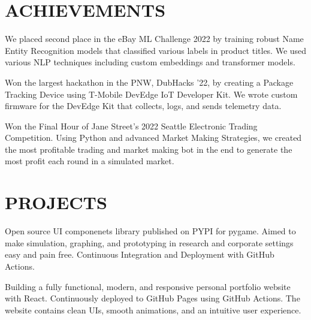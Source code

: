 \documentclass[]{main}
\begin{document}
\begin{minipage}[t]{0.66\textwidth}
\section{ACHIEVEMENTS}

We placed second place in the eBay ML Challenge 2022 by training robust Name Entity Recognition models that classified various labels in product titles. We used various NLP techniques including custom embeddings and transformer models.
\sectionsep

Won the largest hackathon in the PNW, DubHacks '22, by creating a Package Tracking Device using T-Mobile DevEdge IoT Developer Kit. We wrote custom firmware for the DevEdge Kit that collects, logs, and sends telemetry data.
\sectionsep

Won the Final Hour of Jane Street's 2022 Seattle Electronic Trading Competition. Using Python and advanced Market Making Strategies, we created the most profitable trading and market making bot in the end to generate the most profit each round in a simulated market.
\sectionsep



\section{PROJECTS}
Open source UI componenets library published on PYPI for pygame. Aimed to make simulation, graphing, and prototyping in research and corporate settings easy and pain free. Continuous Integration and Deployment with GitHub Actions. 
\sectionsep

Building a fully functional, modern, and responsive personal portfolio website with React. Continuously deployed to GitHub Pages using GitHub Actions. The website contains clean UIs, smooth animations, and an intuitive user experience.

\sectionsep

\end{minipage} 
\end{document}
